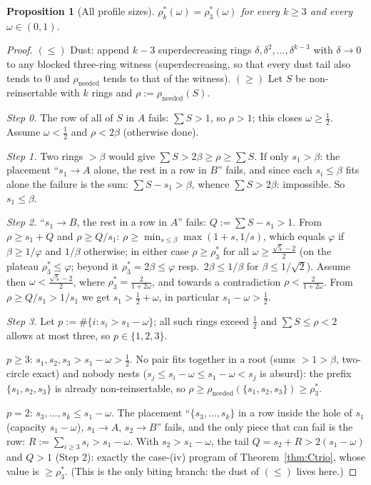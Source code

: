 \documentclass[11pt]{article}
\newtheorem{proposition}[theorem]{Proposition}
\theoremstyle{definition}
\begin{document}
\begin{proposition}[All profile sizes]\label{prop:Callk}
$\rho^*_k(\omega)=\rho^*_3(\omega)$ for every $k\ge3$ and every
$\omega\in(0,1)$.
\end{proposition}
\begin{proof}
$(\le)$ Dust: append $k-3$ superdecreasing rings
$\delta,\delta^2,\dots,\delta^{k-3}$ with $\delta\to0$ to any blocked
three-ring witness (superdecreasing, so that every dust tail also tends to
$0$ and $\rho_{\mathrm{needed}}$ tends to that of the witness).
$(\ge)$ Let $S$ be non-reinsertable with $k$ rings and
$\rho:=\rho_{\mathrm{needed}}(S)$.

\emph{Step 0.} The row of all of $S$ in $A$ fails: $\sum S>1$, so $\rho>1$;
this closes $\omega\ge\tfrac12$. Assume $\omega<\tfrac12$ and
$\rho<2\beta$ (otherwise done).

\emph{Step 1.} Two rings $>\beta$ would give $\sum S>2\beta\ge\rho\ge\sum S$.
If only $s_1>\beta$: the placement ``$s_1\to A$ alone, the rest in a row in
$B$'' fails, and since each $s_i\le\beta$ fits alone the failure is the
sum: $\sum S-s_1>\beta$, whence $\sum S>2\beta$: impossible. So
$s_1\le\beta$.

\emph{Step 2.} ``$s_1\to B$, the rest in a row in $A$'' fails:
$Q:=\sum S-s_1>1$. From $\rho\ge s_1+Q$ and $\rho\ge Q/s_1$:
$\rho\ge\min_{s\le\beta}\max(1+s,1/s)$, which equals $\varphi$ if
$\beta\ge1/\varphi$ and $1/\beta$ otherwise; in either case
$\rho\ge\rho^*_3$ for all $\omega\ge\tfrac{\sqrt5-2}{2}$ (on the plateau
$\rho^*_3\le\varphi$; beyond it $\rho^*_3=2\beta\le\varphi$ resp.\
$2\beta\le1/\beta$ for $\beta\le1/\sqrt2$). Assume then
$\omega<\tfrac{\sqrt5-2}{2}$, where $\rho^*_3=\tfrac{2}{1+2\omega}$, and
towards a contradiction $\rho<\tfrac{2}{1+2\omega}$. From
$\rho\ge Q/s_1>1/s_1$ we get $s_1>\tfrac12+\omega$, in particular
$s_1-\omega>\tfrac12$.

\emph{Step 3.} Let $p:=\#\{i:s_i>s_1-\omega\}$; all such rings exceed
$\tfrac12$ and $\sum S\le\rho<2$ allows at most three, so $p\in\{1,2,3\}$.

$p\ge3$: $s_1,s_2,s_3>s_1-\omega>\tfrac12$. No pair fits together in a root
(sums $>1>\beta$, two-circle exact) and nobody nests
($s_j\le s_i-\omega\le s_1-\omega<s_j$ is absurd): the prefix
$\{s_1,s_2,s_3\}$ is already non-reinsertable, so
$\rho\ge\rho_{\mathrm{needed}}(\{s_1,s_2,s_3\})\ge\rho^*_3$.

$p=2$: $s_3,\dots,s_k\le s_1-\omega$. The placement ``$\{s_3,\dots,s_k\}$
in a row inside the hole of $s_1$ (capacity $s_1-\omega$), $s_1\to A$,
$s_2\to B$'' fails, and the only piece that can fail is the row:
$R:=\sum_{i\ge3}s_i>s_1-\omega$. With $s_2>s_1-\omega$, the tail
$Q=s_2+R>2(s_1-\omega)$ and $Q>1$ (Step 2): exactly the case-(iv) program
of Theorem~\ref{thm:Ctrio}, whose value is $\ge\rho^*_3$. (This is the only
biting branch: the dust of $(\le)$ lives here.)


\end{proof}
\end{document}
